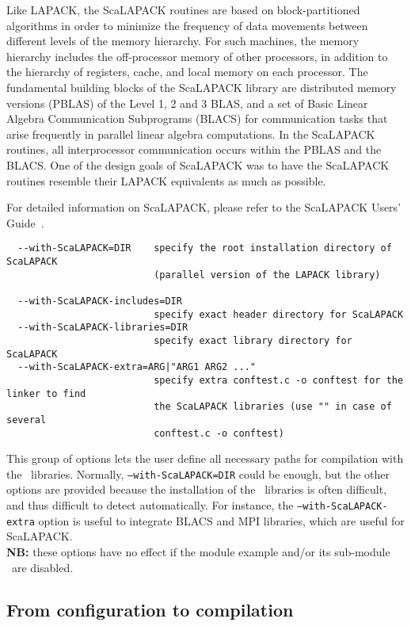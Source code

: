 Like LAPACK, the ScaLAPACK routines are based on block-partitioned
algorithms in order to minimize the frequency of data movements
between different levels of the memory hierarchy. For such machines,
the memory hierarchy includes the off-processor memory of other
processors, in addition to the hierarchy of registers, cache, and
local memory on each processor.  The fundamental building blocks of
the ScaLAPACK library are distributed memory versions (PBLAS) of the
Level 1, 2 and 3 BLAS, and a set of Basic Linear Algebra Communication
Subprograms (BLACS) for communication tasks that arise frequently in
parallel linear algebra computations. In the ScaLAPACK routines, all
interprocessor communication occurs within the PBLAS and the BLACS.
One of the design goals of ScaLAPACK was to have the ScaLAPACK
routines resemble their LAPACK equivalents as much as possible.

For detailed information on ScaLAPACK, please refer to the ScaLAPACK
Users' Guide~\cite{BCC+97}.


{\footnotesize
\begin{verbatim}
  --with-ScaLAPACK=DIR    specify the root installation directory of ScaLAPACK
                          (parallel version of the LAPACK library)

  --with-ScaLAPACK-includes=DIR
                          specify exact header directory for ScaLAPACK
  --with-ScaLAPACK-libraries=DIR
                          specify exact library directory for ScaLAPACK
  --with-ScaLAPACK-extra=ARG|"ARG1 ARG2 ..."
                          specify extra conftest.c -o conftest for the linker to find 
                          the ScaLAPACK libraries (use "" in case of several 
                          conftest.c -o conftest)
\end{verbatim}
}

\noindent This group of options lets the user define all necessary
paths for compilation with the \scalapack\ libraries. Normally,
\texttt{--with-ScaLAPACK=DIR} could be enough, but the other options
are provided because the installation of the \scalapack\ libraries is
often difficult, and thus difficult to detect automatically. For
instance, the \texttt{--with-ScaLAPACK-extra} option is useful to
integrate BLACS and MPI libraries, which are useful for ScaLAPACK.  \\
\textbf{NB:} these options have no effect if the module example and/or
its sub-module \scalapack\ are disabled.

\subsection{From configuration to compilation}


